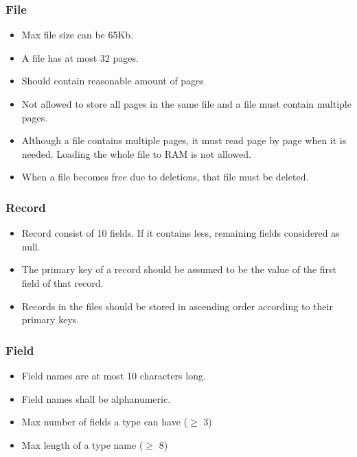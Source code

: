 \documentclass{article}
\begin{document}
        \subsubsection{File}
            \begin{itemize}
                \item Max file size can be 65Kb.
                \item A file has at most 32 pages.
                \item Should contain reasonable amount of pages 
                \item Not allowed to store all pages in the same file and a file must contain multiple pages.
                \item Although a file contains multiple pages, it must read page by page when it is needed. Loading the whole file to RAM is not allowed.
                \item When a file becomes free due to deletions, that file must be deleted.

            \end{itemize}
        \subsubsection{Record}
            \begin{itemize}
                \item Record consist of 10 fields. If it contains less, remaining fields considered as null.
                \item The primary key of a record should be assumed to be the value of the first field of that record.
                \item Records in the files should be stored in ascending order according to their primary keys.
            \end{itemize}
        \subsubsection{Field}
            \begin{itemize}
                \item Field names are at most 10 characters long.
                \item Field names shall be alphanumeric.
                \item Max number of fields a type can have ($\geq$ 3)
                \item Max length of a type name ($\geq$ 8)
            \end{itemize}
        
\end{document}
